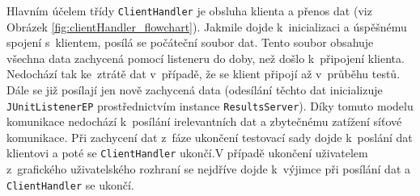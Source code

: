 	Hlavním účelem třídy \texttt{ClientHandler} je obsluha klienta a přenos dat (viz Obrázek \ref{fig:clientHandler_flowchart}). Jakmile dojde k~inicializaci a úspěšnému spojení s~klientem, posílá se počáteční soubor dat. Tento soubor obsahuje všechna data zachycená pomocí listeneru do doby, než došlo k~připojení klienta. Nedochází tak ke~ztrátě dat v~případě, že se klient připojí až v~průběhu testů. Dále se již posílají jen nově zachycená data (odesílání těchto dat inicializuje \texttt{JUnitListenerEP} prostřednictvím instance \texttt{ResultsServer}). Díky tomuto modelu komunikace nedochází k~posílání irelevantních dat a zbytečnému zatížení síťové komunikace. Při zachycení dat z~fáze ukončení testovací sady dojde k~poslání dat klientovi a poté se \texttt{ClientHandler} ukončí.V případě ukončení uživatelem z~grafického uživatelského rozhraní se nejdříve dojde k~výjimce při posílání dat a \texttt{ClientHandler} se ukončí.

